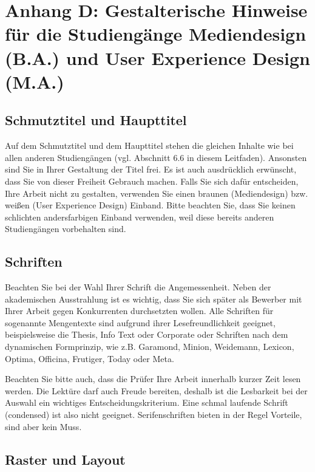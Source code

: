 \chapter*{Anhang D: Gestalterische Hinweise für die Studiengänge Mediendesign (B.A.) und User Experience Design (M.A.)}
\label{app:gestalterische-hinweise}

\section*{Schmutztitel und Haupttitel}

Auf dem Schmutztitel und dem Haupttitel stehen die gleichen Inhalte wie bei allen anderen Studiengängen (vgl. Abschnitt 6.6 in diesem Leitfaden). Ansonsten sind Sie in Ihrer Gestaltung der Titel frei. Es ist auch ausdrücklich erwünscht, dass Sie von dieser Freiheit Gebrauch machen. Falls Sie sich dafür entscheiden, Ihre Arbeit nicht zu gestalten, verwenden Sie einen braunen (Mediendesign) bzw. weißen (User Experience Design) Einband. Bitte beachten Sie, dass Sie keinen schlichten andersfarbigen Einband verwenden, weil diese bereits anderen Studiengängen vorbehalten sind.

\section*{Schriften}

Beachten Sie bei der Wahl Ihrer Schrift die Angemessenheit. Neben der akademischen Ausstrahlung ist es wichtig, dass Sie sich später als Bewerber mit Ihrer Arbeit gegen Konkurrenten durchsetzten wollen. Alle Schriften für sogenannte Mengentexte sind aufgrund ihrer Lesefreundlichkeit geeignet, beispielsweise die Thesis, Info Text oder Corporate oder Schriften nach dem dynamischen Formprinzip, wie z.B. Garamond, Minion, Weidemann, Lexicon, Optima, Officina, Frutiger, Today oder Meta.

Beachten Sie bitte auch, dass die Prüfer Ihre Arbeit innerhalb kurzer Zeit lesen werden. Die Lektüre darf auch Freude bereiten, deshalb ist die Lesbarkeit bei der Auswahl ein wichtiges Entscheidungskriterium. Eine schmal laufende Schrift (condensed) ist also nicht geeignet. Serifenschriften bieten in der Regel Vorteile, sind aber kein Muss.

\section*{Raster und Layout}

